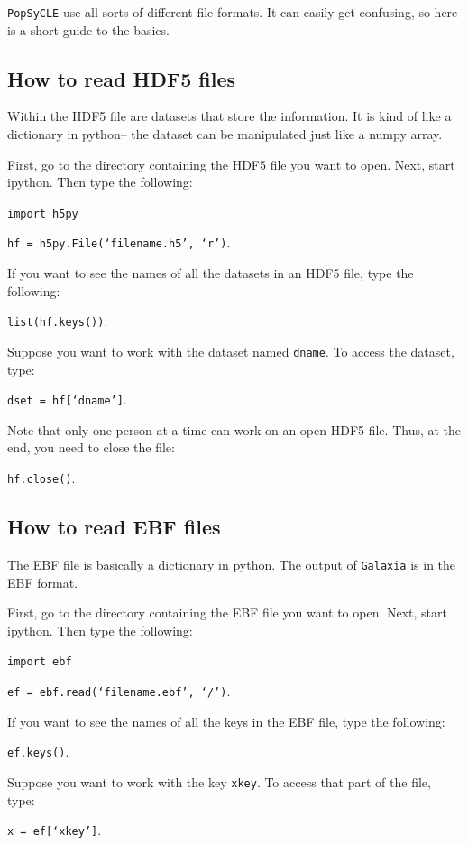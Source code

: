\documentclass{scrartcl}
\begin{document}
\texttt{PopSyCLE} use all sorts of different file formats. 
It can easily get confusing, so here is a short guide to the basics.

\subsection{How to read HDF5 files}

Within the HDF5 file are datasets that store the information. It is kind of like a dictionary in python-- the dataset can be manipulated just like a numpy array.

First, go to the directory containing the HDF5 file you want to open. Next, start ipython. Then type the following:

\texttt{import h5py}

\texttt{hf = h5py.File(`filename.h5', `r')}.

If you want to see the names of all the datasets in an HDF5 file, type the following:

\texttt{list(hf.keys())}.

Suppose you want to work with the dataset named \texttt{dname}. 
To access the dataset, type:

\texttt{dset = hf[`dname']}.

Note that only one person at a time can work on an open HDF5 file. Thus, at the end, you need to close the file:

\texttt{hf.close()}.

\subsection{How to read EBF files}

The EBF file is basically a dictionary in python. 
The output of \texttt{Galaxia} is in the EBF format. 

First, go to the directory containing the EBF file you want to open. 
Next, start ipython. 
Then type the following:

\texttt{import ebf}

\texttt{ef = ebf.read(`filename.ebf', `/')}.

If you want to see the names of all the keys in the EBF file, type the following:

\texttt{ef.keys()}.

Suppose you want to work with the key \texttt{xkey}. To access that part of the file, type:

\texttt{x = ef[`xkey']}.
\end{document}
